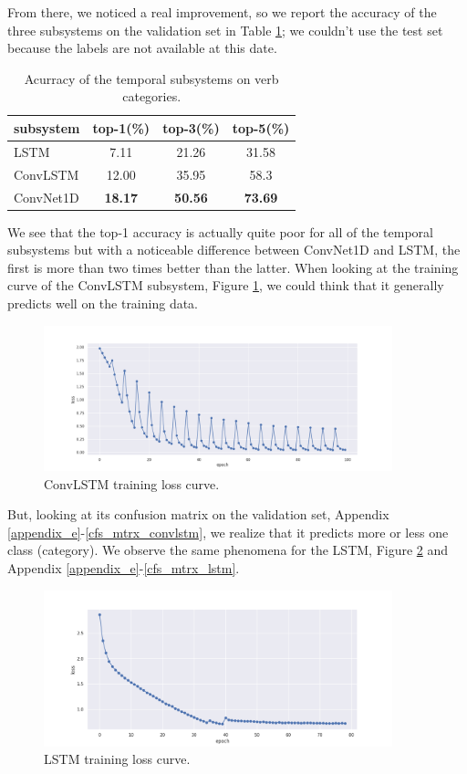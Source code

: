 \documentclass[12pt, a4paper]{report}
\begin{document}
			From there, we noticed a real improvement, so we report the accuracy of the three subsystems on the validation set in Table \ref{accuracy}; we couldn't use the test set because the labels are not available at this date.
			\begin{table}[h!]
				\centering
				\begin{tabular}{ l c c c } 
					subsystem & top-1(\%)  & top-3(\%) & top-5(\%) \\
					\hline
					LSTM & 7.11 & 21.26 & 31.58 \\
					ConvLSTM & 12.00 & 35.95 & 58.3 \\
					ConvNet1D & \textbf{18.17} & \textbf{50.56} & \textbf{73.69} \\
				\end{tabular}
				\caption{Acurracy of the temporal subsystems on verb categories.}
				\label{accuracy}
			\end{table}
			We see that the top-1 accuracy is actually quite poor for all of the temporal subsystems but with a noticeable difference between ConvNet1D and LSTM, the first is more than two times better than the latter.
			When looking at the training curve of the ConvLSTM subsystem, Figure \ref{convlstm_curve}, we could think that it generally predicts well on the training data.
			\begin{figure}[h!]
				\centering
				\includegraphics[width=0.9\textwidth]{curve.png}
				\caption{ConvLSTM training loss curve.\protect\footnotemark}
				\label{convlstm_curve}
			\end{figure}
			But, looking at its confusion matrix on the validation set, Appendix \ref{appendix_e}-\ref{cfs_mtrx_convlstm}, we realize that it predicts more or less one class (category).
			We observe the same phenomena for the LSTM, Figure \ref{lstm_curve} and Appendix \ref{appendix_e}-\ref{cfs_mtrx_lstm}.
			\begin{figure}[h!]
				\centering
				\includegraphics[width=0.9\textwidth]{curve_lstm.png}
				\caption{LSTM training loss curve.}
				\label{lstm_curve}
			\end{figure}
\end{document}
